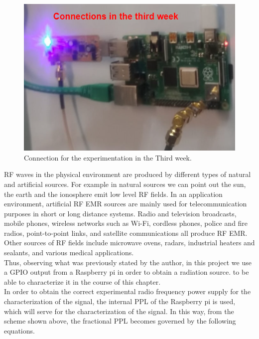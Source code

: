\documentclass[12pt, twoside]{report}
\begin{document}
\begin{figure}[!h]
\centering
  \includegraphics[width=\linewidth]{images/Conn_third.png}
  \caption{Connection for the experimentation in the Third week.}
  \label{fig:week3}
\end{figure}

RF waves in the physical environment are produced by different types of natural and artificial sources. For example in natural sources we can point out the sun, the earth and the ionosphere emit low level RF fields. In an application environment, artificial RF EMR sources are mainly used for telecommunication purposes in short or long distance systems. Radio and television broadcasts, mobile phones, wireless networks such as Wi-Fi, cordless phones, police and fire radios, point-to-point links, and satellite communications all produce RF EMR. Other sources of RF fields include microwave ovens, radars, industrial heaters and sealants, and various medical applications. \\
Thus, observing what was previously stated by the author, in this project we use a GPIO output from a Raspberry pi in order to obtain a radiation source. to be able to characterize it in the course of this chapter.\\
In order to obtain the correct experimental radio frequency power supply for the characterization of the signal, the internal PPL of the Raspberry pi is used, which will serve for the characterization of the signal. In this way, from the scheme shown above, the fractional PPL becomes governed by the following equations.\\
\end{document}
